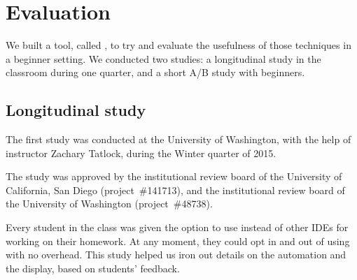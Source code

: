 \section{Evaluation}

We built a tool, called \PeaCoq{}, to try and evaluate the usefulness of those
techniques in a beginner setting.  We conducted two studies: a longitudinal
study in the classroom during one quarter, and a short A/B study with beginners.

\subsection{Longitudinal study}

The first study was conducted at the University of Washington, with the help of
instructor Zachary Tatlock, during the Winter quarter of 2015.

The study was approved by the institutional review board of the University of
California, San Diego (project~\#141713), and the institutional review board of
the University of Washington (project~\#48738).

Every student in the class was given the option to use \PeaCoq{} instead of
other IDEs for working on their homework.  At any moment, they could opt in and
out of using \PeaCoq{} with no overhead.  This study helped us iron out details
on the automation and the display, based on students' feedback.

